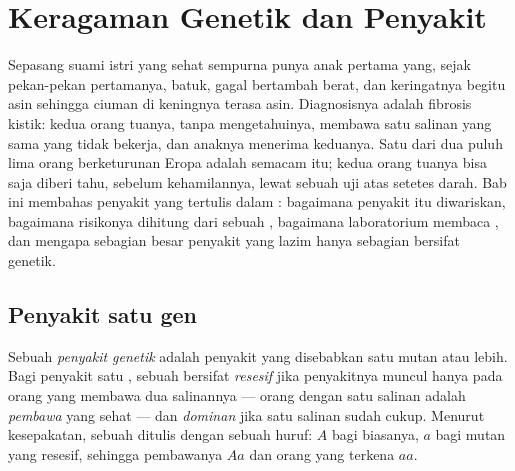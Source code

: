 \chapter{Keragaman Genetik dan Penyakit}\label{ch:g11:genes-and-disease}

Sepasang suami istri yang sehat sempurna punya anak pertama yang, sejak
pekan-pekan pertamanya, batuk, gagal bertambah berat, dan keringatnya
begitu asin sehingga ciuman di keningnya terasa asin. Diagnosisnya
adalah fibrosis kistik: kedua orang tuanya, tanpa mengetahuinya,
membawa satu salinan  yang sama yang tidak bekerja, dan anaknya
menerima keduanya. Satu dari dua puluh lima orang berketurunan Eropa
adalah  semacam itu; kedua orang tuanya bisa saja diberi tahu,
sebelum kehamilannya, lewat sebuah uji atas setetes darah. Bab ini
membahas penyakit yang tertulis dalam : bagaimana penyakit itu
diwariskan, bagaimana risikonya dihitung dari sebuah ,
bagaimana laboratorium membaca , dan mengapa sebagian besar
penyakit yang lazim hanya sebagian bersifat genetik.

\section{Penyakit satu gen}

\begin{definition}\label{def:g11:genes-and-disease:genetic}
Sebuah \emph{penyakit genetik} adalah penyakit
yang disebabkan satu  mutan atau lebih. Bagi penyakit satu ,
sebuah  bersifat \emph{resesif} jika penyakitnya
muncul hanya pada orang yang membawa dua salinannya --- orang dengan
satu salinan adalah \emph{pembawa} yang sehat --- dan
\emph{dominan} jika satu salinan sudah cukup. Menurut
kesepakatan,  sebuah  ditulis dengan sebuah huruf: $A$ bagi 
biasanya, $a$ bagi  mutan yang resesif, sehingga pembawanya $Aa$
dan orang yang terkena $aa$.
\end{definition}

